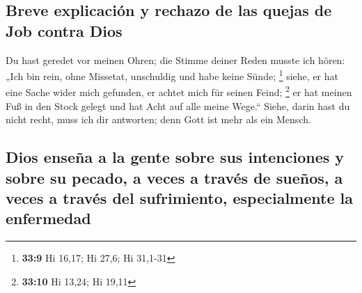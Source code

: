 \hypertarget{breve-explicaciuxf3n-y-rechazo-de-las-quejas-de-job-contra-dios}{%
\subsection{Breve explicación y rechazo de las quejas de Job contra
Dios}\label{breve-explicaciuxf3n-y-rechazo-de-las-quejas-de-job-contra-dios}}

 Du hast geredet vor meinen Ohren; die Stimme deiner Reden
musste ich hören:  „Ich bin rein, ohne Missetat,
unschuldig und habe keine Sünde; \footnote{\textbf{33:9} Hi 16,17; Hi
  27,6; Hi 31,1-31}  siehe, er hat eine Sache wider mich
gefunden, er achtet mich für seinen Feind; \footnote{\textbf{33:10} Hi
  13,24; Hi 19,11}  er hat meinen Fuß in den Stock gelegt
und hat Acht auf alle meine Wege.``  Siehe, darin hast du
nicht recht, muss ich dir antworten; denn Gott ist mehr als ein Mensch.

\hypertarget{dios-enseuxf1a-a-la-gente-sobre-sus-intenciones-y-sobre-su-pecado-a-veces-a-travuxe9s-de-sueuxf1os-a-veces-a-travuxe9s-del-sufrimiento-especialmente-la-enfermedad}{%
\subsection{Dios enseña a la gente sobre sus intenciones y sobre su
pecado, a veces a través de sueños, a veces a través del sufrimiento,
especialmente la
enfermedad}\label{dios-enseuxf1a-a-la-gente-sobre-sus-intenciones-y-sobre-su-pecado-a-veces-a-travuxe9s-de-sueuxf1os-a-veces-a-travuxe9s-del-sufrimiento-especialmente-la-enfermedad}}

